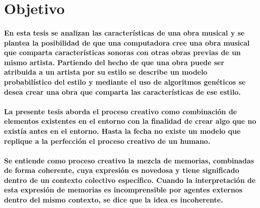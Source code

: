 \section{Objetivo}
\paragraph{En esta tesis se analizan las características de una obra musical y se plantea la posibilidad de que una computadora cree una obra musical que comparta características sonoras con otras obras previas de un mismo artista. Partiendo del hecho de que una obra puede ser atribuida a un artista por su estilo se describe un modelo probabilístico del estilo y mediante el uso de algoritmos genéticos se desea crear una obra que comparta las características de ese estilo.}

\begin{comment}
  TODO: Preguntas que inmediatamente saltan a la mente del lector (y que habría que responder aquí mismo): ¿por qué algoritmos genéticos?  ¿No hay otras formas posibles de hacerlo?  En caso de que las haya, ¿los algoritmos genéticos tienen alguna ventaja sobre las demás posibles formas de lograrlo?
\end{comment}

\paragraph{La presente tesis aborda el proceso creativo como combinación de elementos existentes en el entorno con la finalidad de crear algo que no existía antes en el entorno. Hasta la fecha no existe un modelo que replique a la perfección el proceso creativo de un humano.}

\begin{comment}
  REVIEW: Pero sí ha habido otros esfuerzos...habría que mencionar un puñado de ejemplos (tanto musicales como de otros ámbitos), citando publicaciones y mencionando qué hacen (y qué les falla o les falta).
\end{comment}

\paragraph{Se entiende como proceso creativo la mezcla de memorias, combinadas de forma coherente, cuya expresión es novedosa y tiene significado dentro de un contexto colectivo específico. Cuando la interpretación de esta expresión de memorias es incomprensible por agentes externos dentro del mismo contexto, se dice que la idea es incoherente.}

